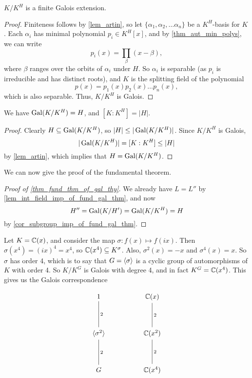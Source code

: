 \begin{corollary}
\label{cor_fixed_field_ext_is_gal}
    $K/K^H$ is a finite Galois extension.
\end{corollary}

\begin{proof}
    Finiteness follows by \cref{lem_artin}, so let $\{\alpha_1, \alpha_2, \ldots \alpha_n\}$ be a $K^H$-basis for $K$. Each $\alpha_i$ has minimal polynomial $p_i \in K^H[x]$, and by \cref{thm_aut_min_polys}, we can write
    \[
        p_i(x) = \prod_{\beta} (x - \beta),
    \]
    where $\beta$ ranges over the orbits of $\alpha_i$ under $H$. So $\alpha_i$ is separable (as $p_i$ is irreducible and has distinct roots), and $K$ is the splitting field of the polynomial
    \[
        p(x) = p_1(x) p_2(x) \ldots p_n(x),
    \]
    which is also separable. Thus, $K/K^H$ is Galois.
\end{proof}

\begin{corollary}
\label{cor_subgroup_imp_of_fund_gal_thm}
    We have $\operatorname{Gal}(K/K^H) = H$, and $[K : K^H] = |H|$.
\end{corollary}

\begin{proof}
    Clearly $H \subseteq \operatorname{Gal}(K/K^H)$, so $|H| \leq |\operatorname{Gal}(K/K^H)|$. Since $K/K^H$ is Galois,
    \[
        |\operatorname{Gal}(K/K^H)| = [K : K^H] \leq |H|
    \]
    by \cref{lem_artin}, which implies that $H = \operatorname{Gal}(K/K^H)$. 
\end{proof}

We can now give the proof of the fundamental theorem.

\begin{proof}[Proof of \cref{thm_fund_thm_of_gal_thy}]
    We already have $L = L''$ by \cref{lem_int_field_imp_of_fund_gal_thm}, and now
    \[
        H'' = \operatorname{Gal}(K/H') = \operatorname{Gal}(K/K^H) = H
    \]
    by \cref{cor_subgroup_imp_of_fund_gal_thm}.
\end{proof}

\begin{example}
    Let $K = \mathbb{{C}}(x)$, and consider the map $\sigma : f(x) \longmapsto f(ix)$. Then $\sigma(x^4) = (ix)^4 = x^4$, so $\mathbb{{C}}(x^4) \subseteq K^\sigma$. Also, $\sigma^2(x) = -x$ and $\sigma^4(x) = x$. So $\sigma$ has order 4, which is to say that $G = \langle {\sigma} \rangle$ is a cyclic group of automorphisms of $K$ with order 4. So $K/K^G$ is Galois with degree 4, and in fact $K^G = \mathbb{{C}}(x^4)$. This gives us the Galois correspondence
    \begin{figure}[h]
        \[
            \begin{tikzcd}
            	1 && {\mathbb{C}(x)} \\
            	\\
            	{\langle \sigma^2 \rangle} && {\mathbb{C}(x^2)} \\
            	\\
            	G && {\mathbb{C}(x^4)}
            	\arrow["2", no head, from=1-1, to=3-1]
            	\arrow["2", no head, from=3-1, to=5-1]
            	\arrow["2", no head, from=1-3, to=3-3]
            	\arrow["2", no head, from=3-3, to=5-3]
            \end{tikzcd}
        \]
    \end{figure}
\end{example}
